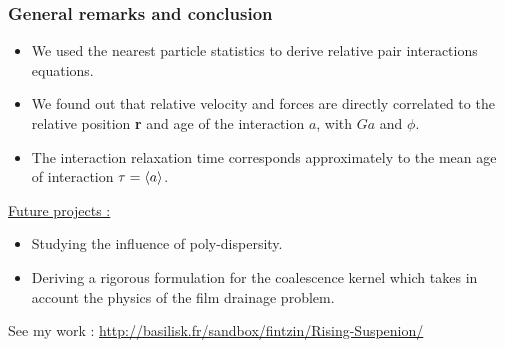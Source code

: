 \documentclass{sintefbeamer}
\begin{document}
\begin{frame}
  \frametitle{General remarks and conclusion}

  \begin{itemize}
    \item We used the nearest particle statistics to derive relative pair interactions equations. 
    \item We found out that relative velocity and forces are directly correlated to the relative position \textbf{r} and age of the interaction $a$, with $Ga$ and $\phi$. 
    \item The interaction relaxation time corresponds approximately to the mean age of interaction $\tau =\left<a\right>$. 
  \end{itemize}
    \underline{Future projects : }  
    \begin{itemize}
      \item Studying the influence of poly-dispersity. 
      \item Deriving a rigorous formulation for the coalescence kernel which takes in account the physics of the film drainage problem. 
    \end{itemize}
\vfill    
See my work : \url{http://basilisk.fr/sandbox/fintzin/Rising-Suspenion/}

\end{frame}
\end{document}
